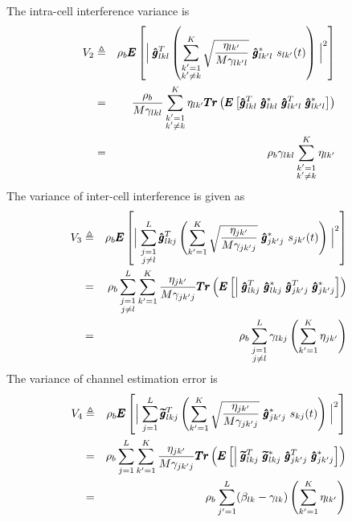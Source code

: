 \documentclass[10pt, a4paper, twoside,fleqn]{article}
\begin{document}
The intra-cell interference variance is
\begin{eqnarray}\label{eq:noiseF2}
	V_2 &\triangleq& \rho_b \pmb{E}\left[\Bigm| \pmb{\hat g}^T_{lkl}  \left(\sum_{\substack{k'=1 \\ k' \neq k}}^{K} \sqrt{\frac{\eta_{lk'}}{M\gamma_{lk'l}}} \ \pmb{\hat g}^*_{lk'l} \ s_{lk'} (t)\right)\Bigm|^2\right] \nonumber \\
        &=& \frac{\rho_b}{M\gamma_{lkl}} \sum_{\substack{k'=1 \\ k' \neq k}}^{K}\eta_{lk'} \pmb{Tr}\left(\pmb{E}\left[ \pmb{\hat g}^T_{lkl} \ \pmb{\hat g}_{lkl}^* \ \pmb{\hat g}^T_{lk'l} \ \pmb{\hat g}_{lk'l}^{*} \right]\right) \nonumber \\
	    &=&  \rho_b\gamma_{lkl}\sum\limits_{\substack{k'=1\\ k'\neq k}}^{K}\eta_{lk'}
\end{eqnarray}
The variance of inter-cell interference is given as
\begin{eqnarray}\label{eq:noiseF3}
	V_3 &\triangleq& \rho_b \pmb{E}\left[\Bigm|\sum_{\substack{j=1 \\ j \neq l}}^{L} \pmb{\hat g}_{lkj}^T \left(\sum_{k'=1}^{K} \sqrt{\frac{\eta_{jk'}}{M\gamma_{jk'j}}} \ \pmb{\hat g}^*_{jk'j} \ s_{jk'} (t)\right)\Bigm|^2\right] \nonumber \\ 
    &=& \rho_b\sum_{\substack{j=1 \\ j \neq l}}^{L} \sum_{k'=1}^{K} \frac{\eta_{jk'}}{M\gamma_{jk'j}} \pmb{Tr}\left(\pmb{E}\left[\Bigm| \pmb{\hat g}_{lkj}^T \ \pmb{\hat g}_{lkj}^* \ \pmb{\hat g}_{jk'j}^T \ \pmb{\hat g}_{jk'j}^{*} \right]\right) \nonumber \\
    &=& \rho_b\sum_{\substack{j=1 \\ j \neq l}}^{L}\gamma_{lkj}\left(\sum_{k'=1}^{K}\eta_{jk'}\right)
\end{eqnarray}
The variance of channel estimation error is
\begin{eqnarray}\label{eqn:noiseF4}
	V_4 &\triangleq& \rho_b \pmb{E} \left[ \Bigm |\sum_{j=1}^{L} \pmb{\widetilde{g}}_{lkj}^T \left(\sum_{k'=1}^{K} \sqrt{\frac{\eta_{jk'}}{M\gamma_{jk'j}}} \ \pmb{\hat g}^*_{jk'j} \ s_{kj} (t)\right)\Bigm|^2 \right] \nonumber \\
     &=& \rho_b\sum_{j=1}^{L} \sum_{k'=1}^{K} \frac{\eta_{jk'}}{M\gamma_{jk'j}} \pmb{Tr}\left(\pmb{E}\left[\Bigm| \pmb{\widetilde{g}}^T_{lkj} \ \pmb{\widetilde{g}}_{lkj}^* \ \pmb{\hat g}_{jk'j}^T \ \pmb{\hat g}_{jk'j}^{*} \right]\right) \nonumber \\
        &=& \rho_b\sum\limits_{j'=1}^{L}(\beta_{lk}-\gamma_{lk})\left(\sum\limits_{k'=1}^{K}\eta_{lk'}\right)
\end{eqnarray}
\end{document}
